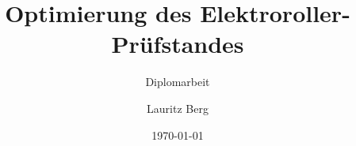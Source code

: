 \titlehead{\centering\texttt{[image: htw-logo]}}%
\subject{Hochschule für Technik und Wirtschaft Dresden\\%
		Fakultät hier einfügen}%
\title{Optimierung des Elektroroller-Prüfstandes}%
\subtitle{Diplomarbeit}%
\author{Lauritz Berg}%
\date{\today}%
\publishers{Betreuer usw.}%
\maketitle%
\newpage%